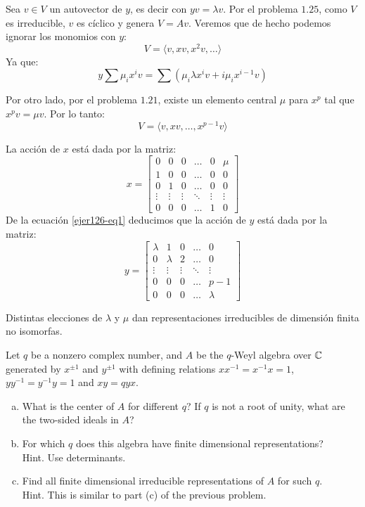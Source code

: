 \documentclass[twoside]{article}
\begin{document}
\begin{solucion}
\begin{enumerate}[(a)]
Sea $v \in V$ un autovector de $y$, es decir con $yv = \lambda v$. Por el problema $1.25$, como $V$ es irreducible, $v$ es cíclico y genera $V=Av$.
Veremos que de hecho podemos ignorar los monomios con $y$:
\[ V = \langle v, xv, x^2v, \dots \rangle \]
Ya que:
\begin{equation}\label{ejer126-eq1} y \sum \mu_i x^i v = \sum\left(\mu_i \lambda x^i v + i \mu_i x^{i-1}v \right) \end{equation}

Por otro lado, por el problema $1.21$, existe un elemento central $\mu$ para $x^p$ tal que $x^pv=\mu v$. Por lo tanto:
\[ V = \langle v, xv, \dots, x^{p-1}v\rangle \]

La acción de $x$ está dada por la matriz:
\[ x = \begin{bmatrix}
0 & 0 & 0 & \dots & 0 & \mu\\
1 & 0 & 0 & \dots & 0 & 0\\
0 & 1 & 0 & \dots & 0 & 0\\
\vdots & \vdots & \vdots & \ddots & \vdots & \vdots\\
0 & 0 & 0 & \dots & 1 & 0
\end{bmatrix}\]
De la ecuación \eqref{ejer126-eq1} deducimos que la acción de $y$ está dada por la matriz:
\[ y = \begin{bmatrix}
\lambda & 1 & 0 & \dots & 0\\
0 & \lambda & 2 & \dots & 0\\
\vdots & \vdots & \vdots & \ddots & \vdots\\
0 & 0 & 0 & \dots & p-1\\
0 & 0 & 0 & \dots & \lambda
\end{bmatrix}\]

Distintas elecciones de $\lambda$ y $\mu$ dan representaciones irreducibles de dimensión finita no isomorfas.
\end{enumerate}
\end{solucion}

\newpage

\begin{ejercicio}{1.27}
Let $q$ be a nonzero complex number, and $A$ be the $q$-Weyl algebra over $\mathbb{C}$ generated by $x^{\pm 1}$ and $y^{\pm 1}$ with defining relations $xx^{-1} = x^{-1}x = 1$, $yy^{-1} = y^{-1}y =1$ and $xy = qyx$.
\begin{enumerate}[(a)]
\item What is the center of $A$ for different $q$? If $q$ is not a root of unity, what are the two-sided ideals in $A$?
\item For which $q$ does this algebra have finite dimensional representations?\\
Hint. Use determinants.
\item Find all finite dimensional irreducible representations of $A$ for such $q$.\\
Hint. This is similar to part (c) of the previous problem.
\end{enumerate}
\end{ejercicio}
\end{document}
